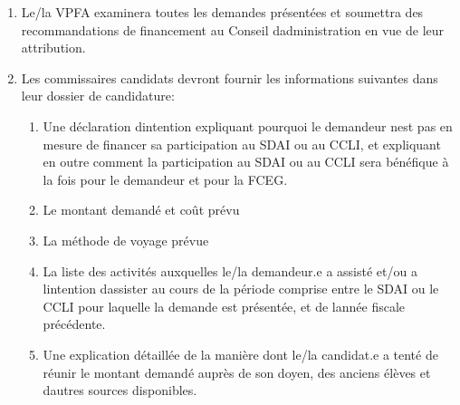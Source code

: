 \begin{enumerate}
 \item
  Le/la VPFA examinera toutes les demandes présentées et soumettra des recommandations de financement au Conseil d\textquotesingle administration en vue de leur attribution.
 \item
  Les commissaires candidats devront fournir les informations suivantes dans leur dossier de candidature:

  \begin{enumerate}
   \item
    Une déclaration d\textquotesingle intention expliquant pourquoi le demandeur n\textquotesingle est pas en mesure de financer sa participation au SDAI ou au CCLI, et expliquant en outre comment la participation au SDAI ou au CCLI sera bénéfique à la fois pour le demandeur et pour la FCEG.
   \item
    Le montant demandé et coût prévu
   \item
    La méthode de voyage prévue
   \item
    La liste des activités auxquelles le/la demandeur.e a assisté et/ou a l\textquotesingle intention d\textquotesingle assister au cours de la période comprise entre le SDAI ou le CCLI pour laquelle la demande est présentée, et de l\textquotesingle année fiscale précédente.
   \item
    Une explication détaillée de la manière dont le/la candidat.e a tenté de réunir le montant demandé auprès de son doyen, des anciens élèves et d\textquotesingle autres sources disponibles.
  \end{enumerate}
\end{enumerate}

